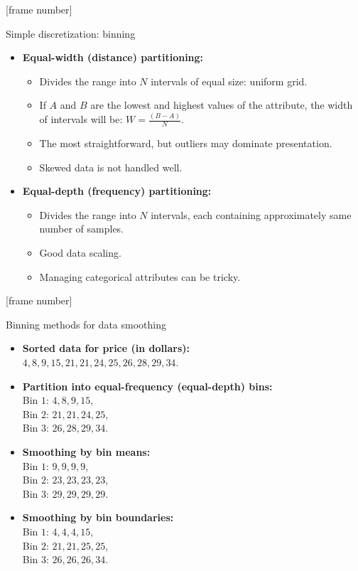 \documentclass[aspectratio=169,t]{beamer}
\begin{document}
  {
    [frame number]
    \begin{frame}{Simple discretization: binning}
    \begin{itemize}
      \item \textbf{Equal-width (distance) partitioning:}
      \begin{itemize}
        \item Divides the range into $N$ intervals of equal size: uniform grid.
        \item If $A$ and $B$ are the lowest and highest values of the attribute, the width of intervals will be: $W = \frac{(B - A)}{N}$.
        \item The most straightforward, but outliers may dominate presentation.
        \item Skewed data is not handled well.
      \end{itemize}
      \item \textbf{Equal-depth (frequency) partitioning:}
      \begin{itemize}
        \item Divides the range into $N$ intervals, each containing approximately same number of samples.
        \item Good data scaling.
        \item Managing categorical attributes can be tricky.
      \end{itemize}
    \end{itemize}
    \end{frame}
  }

  {
    [frame number]
    \begin{frame}{Binning methods for data smoothing}
    \begin{itemize}
      \item \textbf{Sorted data for price (in dollars):} \\
            $4, 8, 9, 15, 21, 21, 24, 25, 26, 28, 29, 34$.
      \item \textbf{Partition into equal-frequency (equal-depth) bins:}\\
            Bin $1$: $4, 8, 9, 15$,\\
            Bin $2$: $21, 21, 24, 25$,\\
            Bin $3$: $26, 28, 29, 34$.
      \item \textbf{Smoothing by bin means:}\\
            Bin $1$: $9, 9, 9, 9$,\\
            Bin $2$: $23, 23, 23, 23$,\\
            Bin $3$: $29, 29, 29, 29$.\\
      \item \textbf{Smoothing by bin boundaries:}\\
            Bin $1$: $4, 4, 4, 15$,\\
            Bin $2$: $21, 21, 25, 25$,\\
            Bin $3$: $26, 26, 26, 34$.\\
    \end{itemize}
    \end{frame}
  }
\end{document}
